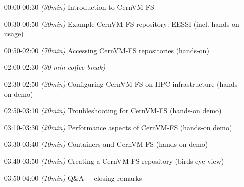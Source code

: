 % 
 

\begin{itemize}[style=standard, labelwidth=1.9cm]

    \item [00:00-00:30] \emph{(30min)} Introduction to CernVM-FS
    \item [00:30-00:50] \emph{(20min)} Example CernVM-FS repository: EESSI (incl. hands-on usage)
    \item [00:50-02:00] \emph{(70min)} Accessing CernVM-FS repositories (hands-on) %

    \item [02:00-02:30] \emph{(30-min coffee break)}

    \item [02:30-02:50] \emph{(20min)} Configuring CernVM-FS on HPC infrastructure (hands-on demo)
    \item [02:50-03:10] \emph{(20min)} Troubleshooting for CernVM-FS (hands-on demo)
    \item [03:10-03:30] \emph{(20min)} Performance aspects of CernVM-FS (hands-on demo)
    \item [03:30-03:40] \emph{(10min)} Containers and CernVM-FS (hands-on demo)
    \item [03:40-03:50] \emph{(10min)} Creating a CernVM-FS repository (birds-eye view)
    \item [03:50-04:00] \emph{(10min)} Q\&A + closing remarks

\end{itemize}

